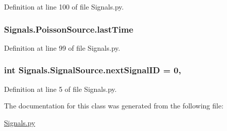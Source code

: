 Definition at line 100 of file Signals.\+py.

\subsubsection[{\texorpdfstring{last\+Time}{lastTime}}]{\setlength{\rightskip}{0pt plus 5cm}Signals.\+Poisson\+Source.\+last\+Time\hspace{0.3cm}{\ttfamily [inherited]}}\hypertarget{classSignals_1_1PoissonSource_a66b0f3fb48cc130b6b07d7427092a522}{}\label{classSignals_1_1PoissonSource_a66b0f3fb48cc130b6b07d7427092a522}


Definition at line 99 of file Signals.\+py.

\subsubsection[{\texorpdfstring{next\+Signal\+ID}{nextSignalID}}]{\setlength{\rightskip}{0pt plus 5cm}int Signals.\+Signal\+Source.\+next\+Signal\+ID = 0\hspace{0.3cm}{\ttfamily [static]}, {\ttfamily [inherited]}}\hypertarget{classSignals_1_1SignalSource_abcff0d069f17cb5ebe3eff15b6283a64}{}\label{classSignals_1_1SignalSource_abcff0d069f17cb5ebe3eff15b6283a64}


Definition at line 5 of file Signals.\+py.



The documentation for this class was generated from the following file\+:\begin{DoxyCompactItemize}
\item 
\hyperlink{Signals_8py}{Signals.\+py}\end{DoxyCompactItemize}
